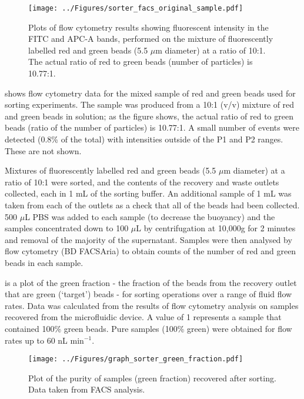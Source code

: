 \begin{figure}
 \centering
 \texttt{[image: ../Figures/sorter\_facs\_original\_sample.pdf]}
 \caption[Plots of flow cytometry results of the mixture of fluorescently labelled red and green beads.]{Plots of flow cytometry results showing fluorescent intensity in the FITC and APC-A bands, performed on the mixture of fluorescently labelled red and green beads (5.5 $\mu$m diameter) at a ratio of 10:1. The actual ratio of red to green beads (number of particles) is 10.77:1.}
 \label{fig:sorter_facs_original_sample}
\end{figure}

 shows flow cytometry data for the mixed sample of red and green beads used for sorting experiments. The sample was produced from a 10:1 (v/v) mixture of red and green beads in solution; as the figure shows, the actual ratio of red to green beads (ratio of the number of particles) is 10.77:1. A small number of events were detected (0.8\% of the total) with intensities outside of the P1 and P2 ranges. These are not shown.

Mixtures of fluorescently labelled red and green beads (5.5 $\mu$m diameter) at a ratio of 10:1 were sorted, and the contents of the recovery and waste outlets collected, each in 1 mL of the sorting buffer. An additional sample of 1 mL was taken from each of the outlets as a check that all of the beads had been collected. 500 $\mu$L PBS was added to each sample (to decrease the buoyancy) and the samples concentrated down to 100 $\mu$L by centrifugation at 10,000g for 2 minutes and removal of the majority of the supernatant. Samples were then analysed by flow cytometry (BD FACSAria) to obtain counts of the number of red and green beads in each sample.

 is a plot of the green fraction - the fraction of the beads from the recovery outlet that are green (`target') beads - for sorting operations over a range of fluid flow rates. Data was calculated from the results of flow cytometry analysis on samples recovered from the microfluidic device. A value of 1 represents a sample that contained 100\% green beads. Pure samples (100\% green) were obtained for flow rates up to 60 nL min$^{-1}$.  

\begin{figure}
 \centering
 \texttt{[image: ../Figures/graph\_sorter\_green\_fraction.pdf]}
 \caption[Plot of the purity of samples (green fraction) recovered after sorting.]{Plot of the purity of samples (green fraction) recovered after sorting. Data taken from FACS analysis.}
 \label{fig:graph_sorter_green_fraction}
\end{figure}

